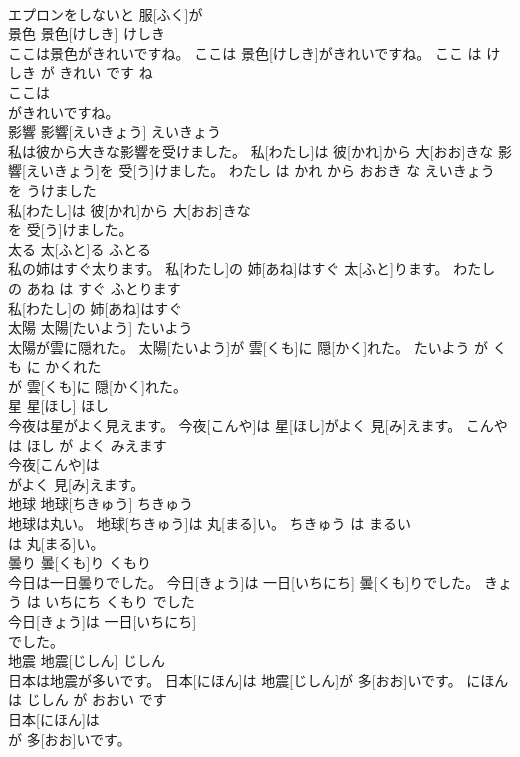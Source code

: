 \documentclass[8pt]{extreport}
\begin{document}
\begin{CJK}{UTF8}{min}
\\	エプロンをしないと 服[ふく]が
\\	景色	景色[けしき]	けしき	
\\	ここは景色がきれいですね。	ここは 景色[けしき]がきれいですね。	ここ は けしき が きれい です ね	
\\	ここは
\\	がきれいですね。			
\\	影響	影響[えいきょう]	えいきょう	
\\	私は彼から大きな影響を受けました。	私[わたし]は 彼[かれ]から 大[おお]きな 影響[えいきょう]を 受[う]けました。	わたし は かれ から おおき な えいきょう を うけました	
\\	私[わたし]は 彼[かれ]から 大[おお]きな
\\	を 受[う]けました。			
\\	太る	太[ふと]る	ふとる	
\\	私の姉はすぐ太ります。	私[わたし]の 姉[あね]はすぐ 太[ふと]ります。	わたし の あね は すぐ ふとります	
\\	私[わたし]の 姉[あね]はすぐ
\\	太陽	太陽[たいよう]	たいよう	
\\	太陽が雲に隠れた。	太陽[たいよう]が 雲[くも]に 隠[かく]れた。	たいよう が くも に かくれた	
\\	が 雲[くも]に 隠[かく]れた。			
\\	星	星[ほし]	ほし	
\\	今夜は星がよく見えます。	今夜[こんや]は 星[ほし]がよく 見[み]えます。	こんや は ほし が よく みえます	
\\	今夜[こんや]は
\\	がよく 見[み]えます。			
\\	地球	地球[ちきゅう]	ちきゅう	
\\	地球は丸い。	地球[ちきゅう]は 丸[まる]い。	ちきゅう は まるい	
\\	は 丸[まる]い。			
\\	曇り	曇[くも]り	くもり	
\\	今日は一日曇りでした。	今日[きょう]は 一日[いちにち] 曇[くも]りでした。	きょう は いちにち くもり でした	
\\	今日[きょう]は 一日[いちにち]
\\	でした。			
\\	地震	地震[じしん]	じしん	
\\	日本は地震が多いです。	日本[にほん]は 地震[じしん]が 多[おお]いです。	にほん は じしん が おおい です	
\\	日本[にほん]は
\\	が 多[おお]いです。			

\end{CJK}
\end{document}
